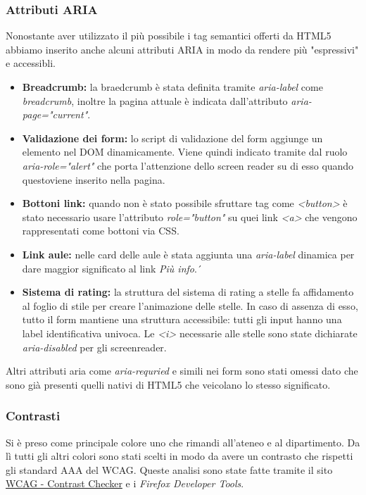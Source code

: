 \subsubsection{Attributi ARIA}
Nonostante aver utilizzato il più possibile i tag semantici offerti da HTML5 abbiamo inserito anche alcuni attributi ARIA in modo da rendere più "espressivi" e accessibli.
\begin{itemize}
    \item \textbf{Breadcrumb:} la braedcrumb è stata definita tramite \textit{aria-label} come \textit{breadcrumb}, inoltre la pagina attuale è indicata dall'attributo \textit{aria-page="current"}.
    \item \textbf{Validazione dei form:} lo script di validazione del form aggiunge un elemento nel DOM dinamicamente. Viene quindi indicato tramite dal ruolo \textit{aria-role="alert"} che porta l'attenzione dello screen reader su di esso quando questoviene inserito nella pagina.
    \item \textbf{Bottoni link:} quando non è stato possibile sfruttare tag come \textit{<button>} è stato necessario usare l'attributo \textit{role="button"} su quei link \textit{<a>} che vengono rappresentati come bottoni via CSS.
    \item \textbf{Link aule:} nelle card delle aule è stata aggiunta una \textit{aria-label} dinamica per dare maggior significato al link \textit{Più info}.´
    \item \textbf{Sistema di rating:} la struttura del sistema di rating a stelle fa affidamento al foglio di stile per creare l'animazione delle stelle. In caso di assenza di esso, tutto il form mantiene una struttura accessibile: tutti gli input hanno una label identificativa univoca. Le \textit{<i>} necessarie alle stelle sono state dichiarate \textit{aria-disabled} per gli screenreader. 
\end{itemize}
Altri attributi aria come \textit{aria-requried} e simili nei form sono stati omessi dato che sono già presenti quelli nativi di HTML5 che veicolano lo stesso significato.

\subsubsection{Contrasti}
Si è preso come principale colore uno che rimandi all'ateneo e al dipartimento. Da lì tutti gli altri colori sono stati scelti in modo da avere un contrasto che rispetti gli standard AAA del WCAG. Queste analisi sono state fatte tramite il sito \href{https://contrastchecker.com/}{WCAG - Contrast Checker} e i \textit{Firefox Developer Tools}.

